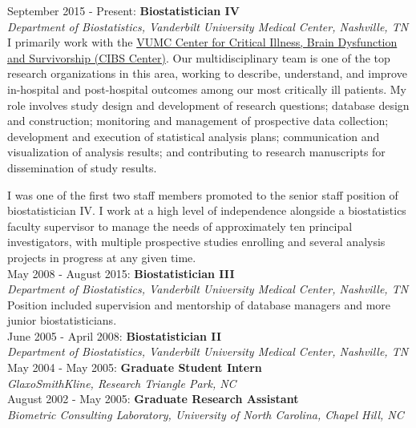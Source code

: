\documentclass[5pt]{article}
\begin{document}
\noindent September 2015 - Present: \textbf{Biostatistician IV}\\
\indent \emph{Department of Biostatistics, Vanderbilt University Medical Center, Nashville, TN}\\
\indent I primarily work with the \href{http://www.icudelirium.org}{VUMC Center for Critical Illness, Brain Dysfunction and Survivorship (CIBS Center)}. Our multidisciplinary team is one of the top research organizations in this area, working to describe, understand, and improve in-hospital and post-hospital outcomes among our most critically ill patients. My role involves study design and development of research questions; database design and construction; monitoring and management of prospective data collection; development and execution of statistical analysis plans; communication and visualization of analysis results; and contributing to research manuscripts for dissemination of study results.

\indent I was one of the first two staff members promoted to the senior staff position of biostatistician IV. I work at a high level of independence alongside a biostatistics faculty supervisor to manage the needs of approximately ten principal investigators, with multiple prospective studies enrolling and several analysis projects in progress at any given time.\\

\noindent May 2008 - August 2015: \textbf{Biostatistician III}\\
\indent \emph{Department of Biostatistics, Vanderbilt University Medical Center, Nashville, TN} \\
\indent Position included supervision and mentorship of database managers and more junior biostatisticians.\\

\noindent June 2005 - April 2008: \textbf{Biostatistician II} \\
\indent \emph{Department of Biostatistics, Vanderbilt University Medical Center, Nashville, TN}\\

\noindent May 2004 - May 2005: \textbf{Graduate Student Intern}\\
\indent \emph{GlaxoSmithKline, Research Triangle Park, NC}\\

\noindent August 2002 - May 2005: \textbf{Graduate Research Assistant}\\ \indent \emph{Biometric Consulting Laboratory, University of North Carolina, Chapel Hill, NC}
\end{document}
